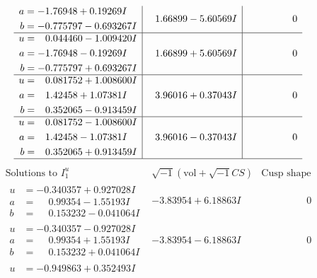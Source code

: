 \documentclass[1p]{elsarticle_modified}
\theoremstyle{definition}
\newcommand{\I}{\sqrt{-1}}
\begin{document}
$$\begin{array}{c|c|c}
\begin{aligned}
a &= -1.76948 + 0.19269 I \\
b &= -0.775797 - 0.693267 I\end{aligned}
 & \phantom{-}1.66899 - 5.60569 I & \phantom{-0.000000 } 0 \\ \hline\begin{aligned}
u &= \phantom{-}0.044460 - 1.009420 I \\
a &= -1.76948 - 0.19269 I \\
b &= -0.775797 + 0.693267 I\end{aligned}
 & \phantom{-}1.66899 + 5.60569 I & \phantom{-0.000000 } 0 \\ \hline\begin{aligned}
u &= \phantom{-}0.081752 + 1.008600 I \\
a &= \phantom{-}1.42458 + 1.07381 I \\
b &= \phantom{-}0.352065 - 0.913459 I\end{aligned}
 & \phantom{-}3.96016 + 0.37043 I & \phantom{-0.000000 } 0 \\ \hline\begin{aligned}
u &= \phantom{-}0.081752 - 1.008600 I \\
a &= \phantom{-}1.42458 - 1.07381 I \\
b &= \phantom{-}0.352065 + 0.913459 I\end{aligned}
 & \phantom{-}3.96016 - 0.37043 I & \phantom{-0.000000 } 0\\
 \hline 
 \end{array}$$\newpage$$\begin{array}{c|c|c}  
\text{Solutions to }I^u_{1}& \I (\text{vol} + \sqrt{-1}CS) & \text{Cusp shape}\\
 \hline 
\begin{aligned}
u &= -0.340357 + 0.927028 I \\
a &= \phantom{-}0.99354 - 1.55193 I \\
b &= \phantom{-}0.153232 - 0.041064 I\end{aligned}
 & -3.83954 + 6.18863 I & \phantom{-0.000000 } 0 \\ \hline\begin{aligned}
u &= -0.340357 - 0.927028 I \\
a &= \phantom{-}0.99354 + 1.55193 I \\
b &= \phantom{-}0.153232 + 0.041064 I\end{aligned}
 & -3.83954 - 6.18863 I & \phantom{-0.000000 } 0 \\ \hline\begin{aligned}
u &= -0.949863 + 0.352493 I \\

\end{aligned}
\end{array}$$
\end{document}
